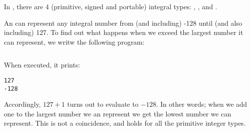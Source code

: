 In \csharp, there are 4 (primitive, signed and portable) integral types: , ,  and .

An  can represent any integral number from (and including) -128 until (and also including) 127. To find out what happens when we exceed the largest number it can represent, we writw the following program:

\inputminted{csharp}{\context/answer/IntegerBoundary.cs}

When executed, it prints:

\begin{verbatim}
127
-128
\end{verbatim}

Accordingly, $127+1$ turns out to evaluate to $-128$. In other words; when we add one to the largest number we an represent we get the lowest number we can represent. This is not a coincidence, and holds for all the primitive integer types.
